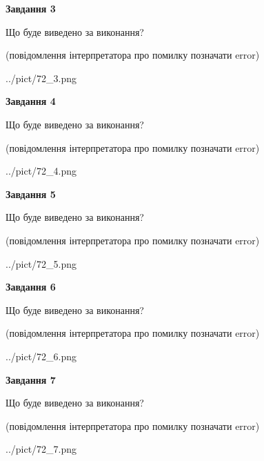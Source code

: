 \documentclass[12pt, ukrainian]{article}
\begin{document}
{\begin {large}
{\begin {center}\textbf{Завдання 3}\end {center}}\par
Що буде виведено за виконання?\par
 (повідомлення інтерпретатора про помилку позначати error)\par
\begin{center}
	{../pict/72_3.png}
\end{center}
\newpage

{\begin {center}\textbf{Завдання 4}\end {center}}\par
Що буде виведено за виконання?\par
 (повідомлення інтерпретатора про помилку позначати error)\par
\begin{center}
	{../pict/72_4.png}
\end{center}
\newpage

{\begin {center}\textbf{Завдання 5}\end {center}}\par
Що буде виведено за виконання?\par
 (повідомлення інтерпретатора про помилку позначати error)\par
\begin{center}
	{../pict/72_5.png}
\end{center}
\newpage

{\begin {center}\textbf{Завдання 6}\end {center}}\par
Що буде виведено за виконання?\par
 (повідомлення інтерпретатора про помилку позначати error)\par
\begin{center}
	{../pict/72_6.png}
\end{center}
\newpage

{\begin {center}\textbf{Завдання 7}\end {center}}\par
Що буде виведено за виконання?\par
 (повідомлення інтерпретатора про помилку позначати error)\par
\begin{center}
	{../pict/72_7.png}
\end{center}
\newpage


\end{large}}
\end{document}
